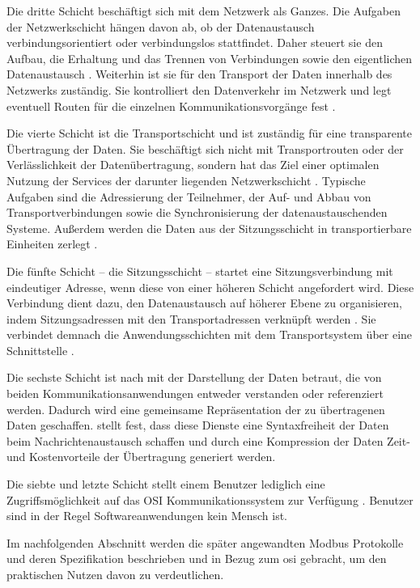 Die dritte Schicht beschäftigt sich mit dem Netzwerk als Ganzes. Die Aufgaben der Netzwerkschicht hängen davon ab, ob der Datenaustausch  verbindungsorientiert oder verbindungslos stattfindet. Daher steuert sie den Aufbau, die Erhaltung und das Trennen von Verbindungen  sowie den eigentlichen Datenaustausch \cite[S.~41f.]{osi96}. Weiterhin ist sie für den Transport der Daten innerhalb des Netzwerks zuständig. Sie kontrolliert den Datenverkehr im Netzwerk und legt eventuell Routen für die einzelnen Kommunikationsvorgänge fest \cite[S.~11f.]{schn06}.

Die vierte Schicht ist die Transportschicht und ist zuständig für eine transparente Übertragung der Daten. Sie beschäftigt sich nicht mit Transportrouten oder der Verlässlichkeit der Datenübertragung, sondern hat das Ziel einer optimalen Nutzung der Services der darunter liegenden Netzwerkschicht \cite[S.~37f.]{osi96}.
Typische Aufgaben sind die Adressierung der Teilnehmer, der Auf- und Abbau von Transportverbindungen sowie die Synchronisierung der datenaustauschenden Systeme. Außerdem werden die Daten aus der Sitzungsschicht in transportierbare Einheiten zerlegt \cite[S.~12f.]{schn06}.

Die fünfte Schicht -- die Sitzungsschicht -- startet eine Sitzungsverbindung mit eindeutiger Adresse, wenn diese von einer höheren Schicht angefordert wird. Diese Verbindung dient dazu, den Datenaustausch auf höherer Ebene zu organisieren, indem Sitzungsadressen mit den Transportadressen verknüpft werden \cite[S.~35]{osi96}. Sie verbindet demnach die Anwendungsschichten mit dem Transportsystem über eine Schnittstelle \cite[S.~13]{schn06}.

Die sechste Schicht ist nach \cite[S.~33f.]{osi96} mit der Darstellung der Daten betraut, die von beiden Kommunikationsanwendungen entweder verstanden oder referenziert werden. Dadurch wird eine gemeinsame Repräsentation der zu übertragenen Daten geschaffen. \cite[S.~13f.]{schn06} stellt fest, dass diese Dienste eine Syntaxfreiheit der Daten beim Nachrichtenaustausch schaffen und durch eine Kompression der Daten Zeit- und Kostenvorteile der Übertragung generiert werden.

Die siebte und letzte Schicht stellt einem Benutzer lediglich eine Zugriffsmöglichkeit auf das OSI Kommunikationssystem zur Verfügung \cite[S.~32]{osi96}. Benutzer sind in der Regel Softwareanwendungen kein Mensch ist. \cite[S.~14]{schn06}

Im nachfolgenden Abschnitt werden die später angewandten Modbus Protokolle und deren Spezifikation beschrieben und in Bezug zum \acrshort{osi} gebracht, um den praktischen Nutzen davon zu verdeutlichen.


